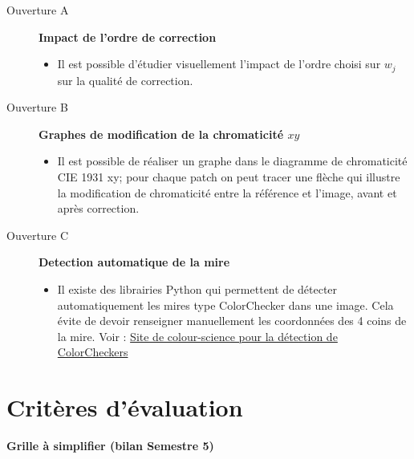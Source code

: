 \begin{description}

	\item[Ouverture A] \textbf{Impact de l'ordre de correction}
	
	\begin{itemize}
		\item Il est possible d'étudier visuellement l'impact de l'ordre choisi sur $w_j$ sur la qualité de correction. 
	\end{itemize}	

\qquad

	\item[Ouverture B] \textbf{Graphes de modification de la chromaticité $xy$}

	
	\begin{itemize}
		\item Il est possible de réaliser un graphe dans le diagramme de chromaticité CIE 1931 xy; pour chaque patch on peut tracer une flèche qui illustre la modification de chromaticité entre la référence et l'image, avant et après correction. 
	\end{itemize}	

\qquad
	
	\item[Ouverture C] \textbf{Detection automatique de la mire}
	\begin{itemize}
		\item Il existe des librairies Python qui permettent de détecter automatiquement les mires type ColorChecker dans une image. Cela évite de devoir renseigner manuellement les coordonnées des 4 coins de la mire. Voir : \href{https://www.colour-science.org/colour-checker-detection/}{Site de colour-science pour la détection de ColorCheckers}
	\end{itemize}
	
\end{description}


\section{Critères d'évaluation}

\textbf{Grille à simplifier (bilan Semestre 5)}

